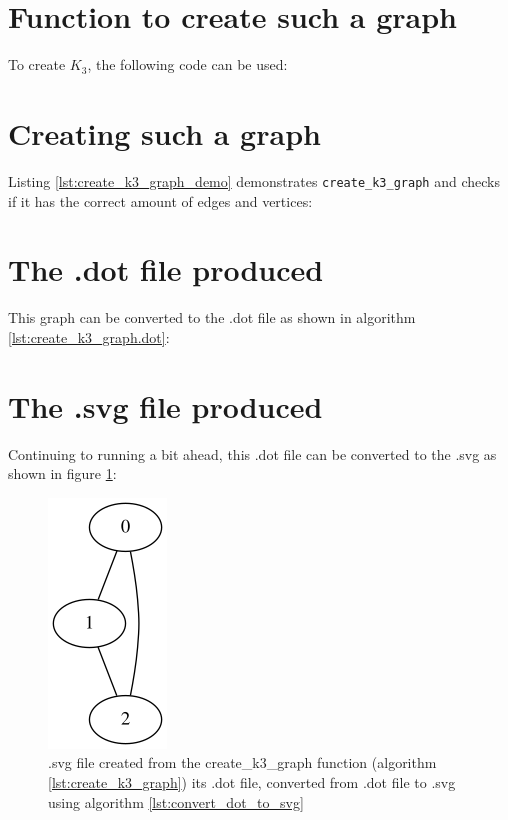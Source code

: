 \section{Function to create such a graph}

To create $K_{3}$, the following code can be used:



\section{Creating such a graph}

Listing \ref{lst:create_k3_graph_demo} demonstrates 
\verb;create_k3_graph; and checks if it has the correct
amount of edges and vertices:



\section{The .dot file produced}
\label{subsec:create_k3_graph.dot}

This graph can be converted to the .dot file as shown in algorithm 
\ref{lst:create_k3_graph.dot}:



\section{The .svg file produced}
\label{subsec:create_k3.svg}

Continuing to running a bit ahead, this .dot file can be converted to the
.svg as shown in figure \ref{fig:create_k3_graph.svg}:

\begin{figure}[!htbp]
  \includegraphics[]{create_k3_graph.png}
  \caption{
    .svg file created from the create\_k3\_graph function 
    (algorithm \ref{lst:create_k3_graph}) its .dot file, 
    converted from .dot file to .svg 
    using algorithm \ref{lst:convert_dot_to_svg}
  }
  \label{fig:create_k3_graph.svg}
\end{figure}

